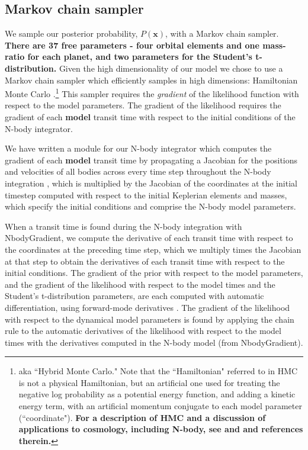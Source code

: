 \documentclass[twocolumn]{aastex63}
\begin{document}
\subsection{Markov chain sampler}

We sample our posterior probability, $P(\mathbf{x})$, with a Markov chain sampler.
\textbf{There are 37 free parameters - four orbital elements and one mass-ratio for
each planet, and two parameters for the Student's t-distribution.}
Given the high dimensionality of our model we chose to use
a Markov chain sampler which efficiently samples in high dimensions:  Hamiltonian
Monte Carlo \citep[HMC; ][]{Duane1987,Neal2011,Betancourt2017,Monnahan2016}.\footnote{aka ``Hybrid Monte Carlo." Note
    that the ``Hamiltonian" referred to in HMC is not a physical Hamiltonian, but an
    artificial one used for treating the negative log probability as a potential
    energy function, and adding a kinetic energy term, with an artificial momentum conjugate
    to each model parameter (``coordinate"). \textbf{For a description of HMC and a discussion of
    applications to cosmology, including N-body, see \citet{Leclercq2014} and \citet{Jasche2010} and references therein.}}  This
sampler requires the {\it gradient} of the likelihood function with respect to
the model parameters.  The gradient of the likelihood requires the gradient
of each \textbf{model} transit time with respect to the initial conditions of the N-body
integrator.

We have written a module for our N-body integrator which computes the
gradient of each \textbf{model} transit time by propagating a Jacobian for the positions
and velocities of all bodies across every time step throughout the N-body
integration \citep{Agol2020}, which is multiplied by the Jacobian of the coordinates at the initial timestep computed with respect to the initial Keplerian elements and masses, which specify the initial conditions and comprise the N-body model parameters.

When a transit time is found during the N-body integration with \textsf{NbodyGradient}, we compute the derivative of each transit time with respect to
the coordinates at the preceding time step, which we multiply times the Jacobian
at that step to obtain the derivatives of each transit time with respect to the
initial conditions.
The gradient of the prior with respect to the model parameters, and the gradient of the likelihood with respect to the model times and the Student's t-distribution parameters, are each computed with automatic
differentiation, using forward-mode derivatives  \citep{Revels2016}.  The gradient of the likelihood with
respect to the dynamical model parameters is found by applying the chain rule to the automatic derivatives of the likelihood with respect to the model times with the derivatives computed in the N-body model (from \textsf{NbodyGradient}).
\end{document}
